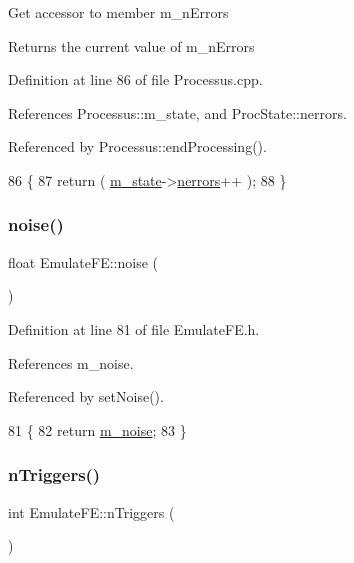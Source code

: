 Get accessor to member m\+\_\+n\+Errors \begin{DoxyReturn}{Returns}
the current value of m\+\_\+n\+Errors 
\end{DoxyReturn}


Definition at line 86 of file Processus.\+cpp.



References Processus\+::m\+\_\+state, and Proc\+State\+::nerrors.



Referenced by Processus\+::end\+Processing().


\begin{DoxyCode}
86                                 \{
87   \textcolor{keywordflow}{return} ( \hyperlink{classProcessus_ab3539eee42891ceae0baf4395ae7fb61}{m\_state}->\hyperlink{structProcState_a51a0f54ba62b07e07ac8518c5f32828d}{nerrors}++ );
88 \}
\end{DoxyCode}
\mbox{\label{classEmulateFE_a3e1a2e88567bf16a5599a1602d6ba50d}} 
\subsubsection{\texorpdfstring{noise()}{noise()}}
{\footnotesize\ttfamily float Emulate\+F\+E\+::noise (\begin{DoxyParamCaption}{ }\end{DoxyParamCaption})\hspace{0.3cm}{\ttfamily [inline]}}



Definition at line 81 of file Emulate\+F\+E.\+h.



References m\+\_\+noise.



Referenced by set\+Noise().


\begin{DoxyCode}
81                \{
82     \textcolor{keywordflow}{return} \hyperlink{classEmulateFE_a74f8720a1da5806fad3811339ef9b98f}{m\_noise};
83   \}
\end{DoxyCode}
\mbox{\label{classEmulateFE_ab08924ef9529a766ce80c9c1c9885cca}} 
\subsubsection{\texorpdfstring{n\+Triggers()}{nTriggers()}}
{\footnotesize\ttfamily int Emulate\+F\+E\+::n\+Triggers (\begin{DoxyParamCaption}{ }\end{DoxyParamCaption})\hspace{0.3cm}{\ttfamily [inline]}}



